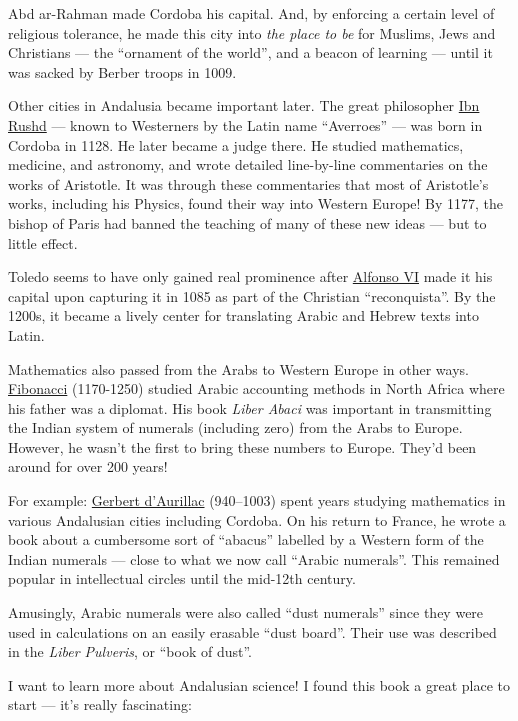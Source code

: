 \documentclass{article}
\begin{document}
Abd ar-Rahman made Cordoba his capital. And, by enforcing a certain
level of religious tolerance, he made this city into \emph{the place to
be} for Muslims, Jews and Christians --- the ``ornament of the world'',
and a beacon of learning --- until it was sacked by Berber troops in
1009.

Other cities in Andalusia became important later. The great philosopher
\href{http://en.wikipedia.org/wiki/Averroes}{Ibn Rushd} --- known to
Westerners by the Latin name ``Averroes'' --- was born in Cordoba in
1128. He later became a judge there. He studied mathematics, medicine,
and astronomy, and wrote detailed line-by-line commentaries on the works
of Aristotle. It was through these commentaries that most of Aristotle's
works, including his Physics, found their way into Western Europe! By
1177, the bishop of Paris had banned the teaching of many of these new
ideas --- but to little effect.

Toledo seems to have only gained real prominence after
\href{http://en.wikipedia.org/wiki/Alfonso_VI_of_Castile}{Alfonso VI}
made it his capital upon capturing it in 1085 as part of the Christian
``reconquista''. By the 1200s, it became a lively center for translating
Arabic and Hebrew texts into Latin.

Mathematics also passed from the Arabs to Western Europe in other ways.
\href{http://www-groups.dcs.st-and.ac.uk/~history/Mathematicians/Fibonacci.html}{Fibonacci}
(1170-1250) studied Arabic accounting methods in North Africa where his
father was a diplomat. His book \emph{Liber Abaci} was important in
transmitting the Indian system of numerals (including zero) from the
Arabs to Europe. However, he wasn't the first to bring these numbers to
Europe. They'd been around for over 200 years!

For example:
\href{http://en.wikipedia.org/wiki/Gerbert_of_Aurillac}{Gerbert
d'Aurillac} (940--1003) spent years studying mathematics in various
Andalusian cities including Cordoba. On his return to France, he wrote a
book about a cumbersome sort of ``abacus'' labelled by a Western form of
the Indian numerals --- close to what we now call ``Arabic numerals''.
This remained popular in intellectual circles until the mid-12th
century.

Amusingly, Arabic numerals were also called ``dust numerals'' since they
were used in calculations on an easily erasable ``dust board''. Their
use was described in the \emph{Liber Pulveris}, or ``book of dust''.

I want to learn more about Andalusian science! I found this book a great
place to start --- it's really fascinating:
\end{document}

